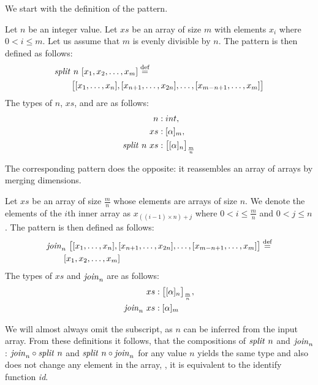 We start with the definition of the \splitN pattern.
\begin{definition}
  \label{definition:pattern:split}
  Let $n$ be an integer value.
  Let $xs$ be an array of size $m$ with elements $x_i$ where $0 < i \leq m$.
  Let us assume that $m$ is evenly divisible by $n$.
  The \splitN pattern is then defined as follows:
  \begin{align*}
    &\text{\textit{split}}\ n\ [x_1, x_2, \dots, x_m] \stackrel{\textrm{\scriptsize def}}{=}\\
    &\qquad\big[[x_1, \ldots, x_n], [x_{n+1}, \ldots, x_{2n}], \ldots, [x_{m-n+1}, \ldots, x_m]\big]
  \end{align*}
  The types of $n$, $xs$, and \splitN are as follows:
  \begin{align*}
    n &: int,\\
    xs &: [\alpha]_m,\\
    \text{\textit{split}}\ n\ xs &: \big[[\alpha]_n\big]_{\frac{m}{n}}
  \end{align*}
\end{definition}

\bigskip

\noindent
The corresponding \join pattern does the opposite:
it reassembles an array of arrays by merging dimensions.
\begin{definition}
  \label{definition:pattern:join}
  Let $xs$ be an array of size $\frac{m}{n}$ whose elements are arrays of size $n$.
  We denote the elements of the $i$th inner array as $x_{((i-1)\times n) + j}$ where $0 < i \leq \frac{m}{n}$ and $0 < j \leq n$.
  The \join pattern is then defined as follows:
  \begin{align*}
    &\text{\textit{join}}_n\ \big[[x_1, \ldots, x_n], [x_{n+1}, \ldots, x_{2n}], \ldots, [x_{m-n+1}, \ldots, x_m]\big] \stackrel{\textrm{\scriptsize def}}{=}\\
    &\qquad[x_1, x_2, \dots, x_m]
  \end{align*}
  The types of $xs$ and $\text{\textit{join}}_n$ are as follows:
  \begin{align*}
    xs &: \big[[\alpha]_n\big]_{\frac{m}{n}},\\
    \text{\textit{join}}_n\ xs &: [\alpha]_m
  \end{align*}
\end{definition}

\noindent
We will almost always omit the subscript, as $n$ can be inferred from the input array.
From these definitions it follows, that the compositions of $\text{\textit{split}}\ n$ and $\text{\textit{join}}_n$: $\text{\textit{join}}_n \circ \text{\textit{split}}\ n$ and $\text{\textit{split}}\ n \circ \text{\textit{join}}_n$ for any value $n$ yields the same type and also does not change any element in the array, \ie, it is equivalent to the identify function \emph{id}.

